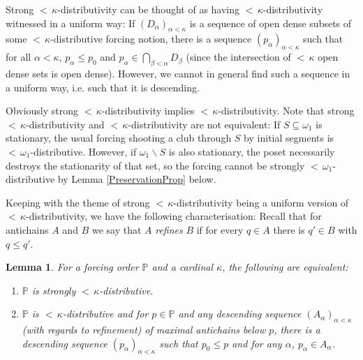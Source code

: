 \documentclass[12pt]{amsart}
\theoremstyle{definition}
\theoremstyle{remark}
\theoremstyle{plain}
\newtheorem{mylem}[mydef]{Lemma}
\numberwithin{mydef}{section}
\newcommand{\dP}{\mathbb{P}}
\begin{document}
	Strong ${<}\,\kappa$-distributivity can be thought of as having ${<}\,\kappa$-distributivity witnessed in a uniform way: If $(D_{\alpha})_{\alpha<\kappa}$ is a sequence of open dense subsets of some ${<}\,\kappa$-distributive forcing notion, there is a sequence $(p_{\alpha})_{\alpha<\kappa}$ such that for all $\alpha<\kappa$, $p_{\alpha}\leq p_0$ and $p_{\alpha}\in\bigcap_{\beta<\alpha}D_{\beta}$ (since the intersection of ${<}\,\kappa$ open dense sets is open dense). However, we cannot in general find such a sequence in a uniform way, i.e. such that it is descending.
	
	Obviously strong ${<}\,\kappa$-distributivity implies ${<}\,\kappa$-distributivity. Note that strong ${<}\,\kappa$-distributivity and ${<}\,\kappa$-distributivity are not equivalent: If $S\subseteq\omega_1$ is stationary, the usual forcing shooting a club through $S$ by initial segments is ${<}\,\omega_1$-distributive. However, if $\omega_1\smallsetminus S$ is also stationary, the poset necessarily destroys the stationarity of that set, so the forcing cannot be strongly ${<}\,\omega_1$-distributive by Lemma \ref{PreservationProp} below.
	
	Keeping with the theme of strong ${<}\,\kappa$-distributivity being a uniform version of ${<}\,\kappa$-distributivity, we have the following characterisation: Recall that for antichains $A$ and $B$ we say that $A$ \emph{refines} $B$ if for every $q\in A$ there is $q'\in B$ with $q\leq q'$.
	
	\begin{mylem}\label{StrongDistAntichain}
		For a forcing order $\dP$ and a cardinal $\kappa$, the following are equivalent:
		\begin{enumerate}
			\item $\dP$ is strongly ${<}\,\kappa$-distributive.
			\item $\dP$ is ${<}\,\kappa$-distributive and for $p\in\dP$ and any descending sequence $(A_{\alpha})_{\alpha<\kappa}$ (with regards to refinement) of maximal antichains below $p$, there is a descending sequence $(p_{\alpha})_{\alpha<\kappa}$ such that $p_0\leq p$ and for any $\alpha$, $p_{\alpha}\in A_{\alpha}$.
		\end{enumerate}
	\end{mylem}
	
\end{document}
